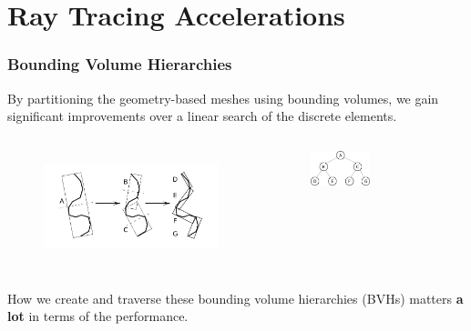 \documentclass[12pt]{beamer}
\begin{document}
\section{Ray Tracing Accelerations} %


\begin{frame}
\frametitle{Bounding Volume Hierarchies}


By partitioning the geometry-based meshes using bounding volumes, we gain significant improvements over a linear search of the discrete elements.
\begin{columns}
  \begin{figure}
    \centering
    \includegraphics[width=1.1\textwidth]{bvh_2d_ex_w_labels.png} 
    \cite{gottschalk1996obbtree}
  \end{figure}
  
  \begin{figure}
    \centering
    \includegraphics[width=0.5\textwidth]{binary_graph.png}
  \end{figure}
\end{columns}

How we create and traverse these bounding volume hierarchies (BVHs) matters \textbf{a lot} in terms of the performance.


\end{frame}
\end{document}
